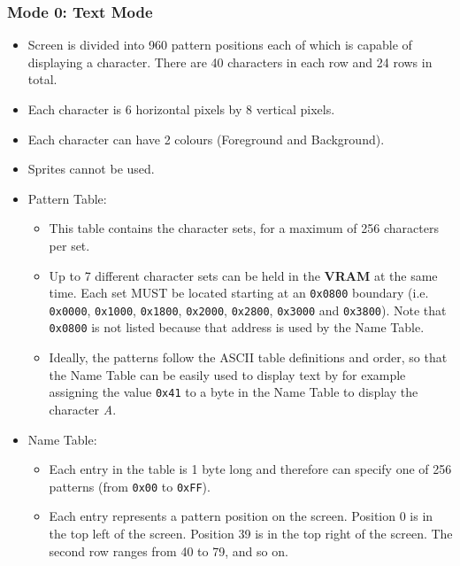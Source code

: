         \subsubsection{Mode 0: \textbf{Text Mode}}
        \begin{itemize}
            \item Screen is divided into 960 pattern positions each of which is
                capable of displaying a character. There are 40 characters in
                each row and 24 rows in total.
            \item Each character is 6 horizontal pixels by 8 vertical pixels.
            \item Each character can have 2 colours (Foreground and Background).
            \item Sprites cannot be used.
            \item Pattern Table:
            \begin{itemize}
                \item This table contains the character sets, for a maximum of
                    256 characters per set.
                \item Up to 7 different character sets can be held in the
                    \textbf{VRAM} at the same time. Each set MUST be located
                    starting at an \texttt{0x0800} boundary (i.e. 
                    \texttt{0x0000}, \texttt{0x1000}, \texttt{0x1800},
                    \texttt{0x2000}, \texttt{0x2800}, \texttt{0x3000} and
                    \texttt{0x3800}). Note that \texttt{0x0800} is not listed
                    because that address is used by the Name Table.
                \item Ideally, the patterns follow the ASCII table definitions
                    and order, so that the Name Table can be easily used to
                    display text by for example assigning the value \texttt{0x41}
                    to a byte in the Name Table to display the character
                    \textit{A}.
            \end{itemize}
            \item Name Table:
            \begin{itemize}
                \item Each entry in the table is 1 byte long and therefore can
                    specify one of 256 patterns (from \texttt{0x00} to
                    \texttt{0xFF}).
                \item Each entry represents a pattern position on the screen.
                    Position 0 is in the top left of the screen. Position 39 is
                    in the top right of the screen. The second row ranges from
                    40 to 79, and so on.
            \end{itemize}
        \end{itemize}

